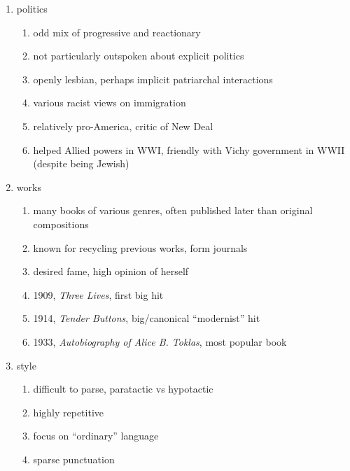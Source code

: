 \documentclass[12pt]{article}
\begin{document}
\begin{enumerate}
\begin{enumerate}
        \begin{enumerate}
        \item tries to resume former activities
        \end{enumerate}
    \item 1938-1946, WWII, Bilignin, SE France
        \begin{enumerate}
        \item friends with reactionary French leader
        \end{enumerate}
    \end{enumerate}
\item politics
    \begin{enumerate}
    \item odd mix of progressive and reactionary
    \item not particularly outspoken about explicit politics
    \item openly lesbian, perhaps implicit patriarchal interactions
    \item various racist views on immigration
    \item relatively pro-America, critic of New Deal
    \item helped Allied powers in WWI, friendly with Vichy government in WWII (despite being Jewish)
    \end{enumerate}
\item works
    \begin{enumerate}
    \item many books of various genres, often published later than original compositions
    \item known for recycling previous works, form journals
    \item desired fame, high opinion of herself
    \item 1909, \textit{Three Lives}, first big hit
    \item 1914, \textit{Tender Buttons}, big/canonical ``modernist'' hit
    \item 1933, \textit{Autobiography of Alice B. Toklas}, most popular book
    \end{enumerate}
\item style
    \begin{enumerate}
    \item difficult to parse, paratactic vs hypotactic
    \item highly repetitive
    \item focus on ``ordinary'' language
    \item sparse punctuation

\end{enumerate}
\end{enumerate}
\end{document}
